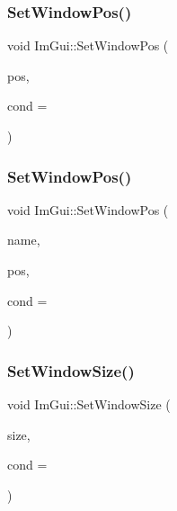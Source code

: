 \subsubsection{\texorpdfstring{Set\+Window\+Pos()}{SetWindowPos()}\hspace{0.1cm}{\footnotesize\ttfamily [1/2]}}
{\footnotesize\ttfamily void Im\+Gui\+::\+Set\+Window\+Pos (\begin{DoxyParamCaption}\item[{const \hyperlink{struct_im_vec2}{Im\+Vec2} \&}]{pos,  }\item[{Im\+Gui\+Cond}]{cond = {} }\end{DoxyParamCaption})}

\hypertarget{namespace_im_gui_a32032b56f975bb3145adbe19f38f3b56}{}\label{namespace_im_gui_a32032b56f975bb3145adbe19f38f3b56} 
\subsubsection{\texorpdfstring{Set\+Window\+Pos()}{SetWindowPos()}\hspace{0.1cm}{\footnotesize\ttfamily [2/2]}}
{\footnotesize\ttfamily void Im\+Gui\+::\+Set\+Window\+Pos (\begin{DoxyParamCaption}\item[{const char $\ast$}]{name,  }\item[{const \hyperlink{struct_im_vec2}{Im\+Vec2} \&}]{pos,  }\item[{Im\+Gui\+Cond}]{cond = {} }\end{DoxyParamCaption})}

\hypertarget{namespace_im_gui_a657c6cc2246485332f608a5204447ea1}{}\label{namespace_im_gui_a657c6cc2246485332f608a5204447ea1} 
\subsubsection{\texorpdfstring{Set\+Window\+Size()}{SetWindowSize()}\hspace{0.1cm}{\footnotesize\ttfamily [1/2]}}
{\footnotesize\ttfamily void Im\+Gui\+::\+Set\+Window\+Size (\begin{DoxyParamCaption}\item[{const \hyperlink{struct_im_vec2}{Im\+Vec2} \&}]{size,  }\item[{Im\+Gui\+Cond}]{cond = {} }\end{DoxyParamCaption})}

